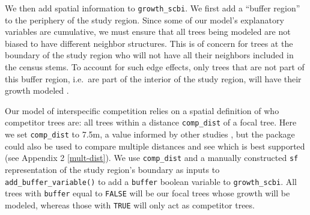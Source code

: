 \documentclass[12pt]{article}
\newenvironment{Shaded}{\begin{snugshade}}{\end{snugshade}}
\newcommand{\CommentTok}[1]{\textcolor[rgb]{0.56,0.35,0.01}{\textit{#1}}}
\newcommand{\DataTypeTok}[1]{\textcolor[rgb]{0.13,0.29,0.53}{#1}}
\newcommand{\DecValTok}[1]{\textcolor[rgb]{0.00,0.00,0.81}{#1}}
\newcommand{\FloatTok}[1]{\textcolor[rgb]{0.00,0.00,0.81}{#1}}
\newcommand{\KeywordTok}[1]{\textcolor[rgb]{0.13,0.29,0.53}{\textbf{#1}}}
\newcommand{\NormalTok}[1]{#1}
\newcommand{\OperatorTok}[1]{\textcolor[rgb]{0.81,0.36,0.00}{\textbf{#1}}}
\newcommand{\StringTok}[1]{\textcolor[rgb]{0.31,0.60,0.02}{#1}}
\begin{document}
We then add spatial information to \texttt{growth\_scbi}. We first add a
``buffer region'' to the periphery of the study region. Since some of
our model's explanatory variables are cumulative, we must ensure that
all trees being modeled are not biased to have different neighbor
structures. This is of concern for trees at the boundary of the study
region who will not have all their neighbors included in the census
stems. To account for such edge effects, only trees that are not part of
this buffer region, i.e.~are part of the interior of the study region,
will have their growth modeled \citep{waller_applied_2004}.

Our model of interspecific competition relies on a spatial definition of
who competitor trees are: all trees within a distance
\texttt{comp\_dist} of a focal tree. Here we set \texttt{comp\_dist} to
7.5m, a value informed by other studies
\citep[\citet{uriarte_spatially_2004},
\citet{canham_neighborhood_2006}]{canham_neighborhood_2004}, but the
package could also be used to compare multiple distances and see which
is best supported (see Appendix 2 \ref{mult-dist}). We use
\texttt{comp\_dist} and a manually constructed \texttt{sf}
representation of the study region's boundary as inputs to
\texttt{add\_buffer\_variable()} to add a \texttt{buffer} boolean
variable to \texttt{growth\_scbi}. All trees with \texttt{buffer} equal
to \texttt{FALSE} will be our focal trees whose growth will be modeled,
whereas those with \texttt{TRUE} will only act as competitor trees.

\begin{Shaded}
\end{Shaded}
\end{document}

